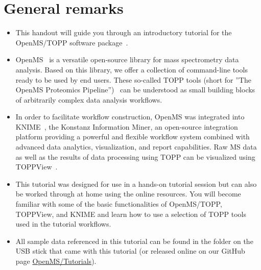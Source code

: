 \documentclass[12pt]{myNotes}
\begin{document}

\firstpages


\setcounter{equation}{0}
\section{General remarks}
\label{General remarks}

\begin{itemize}
\item This handout will guide you through an introductory tutorial for the OpenMS/TOPP software package~\cite{OpenMS}.
\item OpenMS~\cite{Sturm2008,rost2016openms} is a versatile open-source library for mass spectrometry data analysis. Based on this library, we offer a collection
      of command-line tools ready to be used by end users. These so-called TOPP tools (short for ''The OpenMS Proteomics Pipeline'')~\cite{Kohlbacher2007} can be understood as
      small building blocks of arbitrarily complex data analysis workflows.
\item In order to facilitate workflow construction, OpenMS was integrated into KNIME~\cite{KNIME}, the Konstanz
			Information Miner, an open-source integration platform providing a powerful and flexible workflow system
			combined with advanced data analytics, visualization, and report capabilities. Raw MS data as well as the
			results of data processing using TOPP can be visualized using TOPPView~\cite{Sturm2009}.
\item This tutorial was designed for use in a hands-on tutorial session but can also be worked through at home using the online resources. You will become familiar with some of the basic functionalities of OpenMS/TOPP, TOPPView, and KNIME
      and learn how to use a selection of TOPP tools used in the tutorial workflows.
\item All sample data referenced in this tutorial can be found in the  folder on the USB stick that came with this tutorial (or released online on our GitHub page
\hyperlink{https://github.com/OpenMS/Tutorials/releases}{OpenMS/Tutorials}).
\end{itemize}










\end{document}
